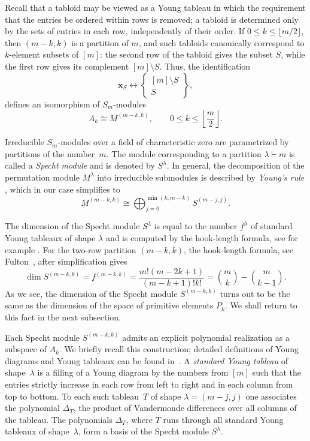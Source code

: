 \documentclass[12pt,reqno]{amsart}
\begin{document}
Recall that a tabloid may be viewed as a Young tableau in which the
requirement that the entries be ordered within rows is removed; a tabloid is
determined only by the sets of entries in each row, independently of their
order. If
$0\le k\le \lfloor m/2\rfloor$, then $(m-k,k)$ is a partition of $m$, and
such tabloids canonically correspond to $k$-element subsets of $[m]$: the
second row of the tabloid gives the subset $S$, while the first row gives its
complement $[m]\setminus S$. Thus, the identification
$$
\boldsymbol{x}_S
\longleftrightarrow
\left\{\begin{array}{c}
[m]\setminus S\\
S
\end{array}\right\},
$$
defines an isomorphism of $S_m$-modules
$$
A_k\cong M^{(m-k,k)},
\qquad 0\le k\le \left\lfloor \frac m2\right\rfloor.
$$

Irreducible $S_m$-modules over a field of characteristic zero are parametrized
by partitions of the number~$m$. The module corresponding to a partition
$\lambda \vdash m$ is called a \emph{Specht module} and is denoted by
$S^\lambda$.
In general, the decomposition of the permutation module $M^\lambda$ into
irreducible submodules is described by \emph{Young's rule}
\cite[Theorem~2.11.2]{Sagan}, which in our case simplifies to
$$
M^{(m-k,k)}
\cong
\bigoplus_{j=0}^{\min(k,m-k)}
S^{(m-j,j)}.
$$

The dimension of the Specht module $S^\lambda$ is equal to the number
$f^\lambda$ of standard Young tableaux of shape $\lambda$ and is computed by
the hook-length formula, see for example \cite[Section~4.3]{Sagan}.
For the two-row partition $(m-k,k)$, the hook-length formula, see
Fulton~\cite[Exercise~9]{Fulton1997}, after simplification gives
\begin{equation} \label{dim_S}
\dim S^{(m-k,k)}=f^{(m-k,k)}
=
\frac{m!(m-2k+1)}{(m-k+1)!k!}
=
\binom{m}{k}-\binom{m}{k-1}.
\end{equation}
As we see, the dimension of the Specht module $S^{(m-k,k)}$ turns out to be
the same as the dimension of the space of primitive elements $P_k$. We shall
return to this fact in the next subsection.

Each Specht module $S^{(m-k,k)}$ admits an explicit polynomial realization as
a subspace of $A_k$.
We briefly recall this construction; detailed definitions of Young diagrams
and Young tableaux can be found in~\cite{Sagan, FH, Fulton1997}.
A \emph{standard Young tableau} of shape~$\lambda$ is a filling of a Young
diagram by the numbers from $[m]$ such that the entries strictly increase in
each row from left to right and in each column from top to bottom.
To each such tableau~$T$ of shape $\lambda=(m-j,j)$ one associates the
polynomial $\Delta_T$, the product of Vandermonde differences over all
columns of the tableau.
The polynomials $\Delta_T$, where $T$ runs through all standard Young tableaux
of shape~$\lambda$, form a basis of the Specht module $S^\lambda$.
\end{document}
